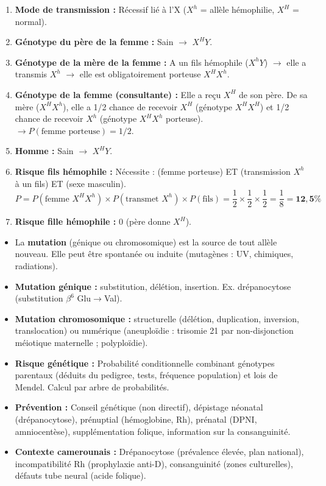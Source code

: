 \documentclass[11pt]{article}
\begin{document}
\begin{corrige}[Exercice n]
\begin{enumerate}
    \item \textbf{Mode de transmission :} Récessif lié à l'X ($X^h$ = allèle hémophilie, $X^H$ = normal).
    \item \textbf{Génotype du père de la femme :} Sain $\to$ $X^H Y$.
    \item \textbf{Génotype de la mère de la femme :} A un fils hémophile ($X^h Y$) $\to$ elle a transmis $X^h$ $\to$ elle est obligatoirement porteuse $X^H X^h$.
    \item \textbf{Génotype de la femme (consultante) :} Elle a reçu $X^H$ de son père. De sa mère ($X^H X^h$), elle a 1/2 chance de recevoir $X^H$ (génotype $X^H X^H$) et 1/2 chance de recevoir $X^h$ (génotype $X^H X^h$ porteuse).
    $\to P(\text{femme porteuse}) = 1/2$.
    \item \textbf{Homme :} Sain $\to$ $X^H Y$.
    \item \textbf{Risque fils hémophile :} Nécessite : (femme porteuse) ET (transmission $X^h$ à un fils) ET (sexe masculin).
    \[
    P = P(\text{femme } X^H X^h) \times P(\text{transmet } X^h) \times P(\text{fils}) = \frac{1}{2} \times \frac{1}{2} \times \frac{1}{2} = \frac{1}{8} = \mathbf{12,5 \%}
    \]
    \item \textbf{Risque fille hémophile :} 0 (père donne $X^H$).
\end{enumerate}
\end{corrige}

\begin{aretenir}
\begin{itemize}
    \item La \textbf{mutation} (génique ou chromosomique) est la source de tout allèle nouveau. Elle peut être spontanée ou induite (mutagènes : UV, chimiques, radiations).
    \item \textbf{Mutation génique :} substitution, délétion, insertion. Ex. drépanocytose (substitution $\beta^6$ Glu$\to$Val).
    \item \textbf{Mutation chromosomique :} structurelle (délétion, duplication, inversion, translocation) ou numérique (aneuploïdie : trisomie 21 par non-disjonction méiotique maternelle ; polyploïdie).
    \item \textbf{Risque génétique :} Probabilité conditionnelle combinant génotypes parentaux (déduits du pedigree, tests, fréquence population) et lois de Mendel. Calcul par arbre de probabilités.
    \item \textbf{Prévention :} Conseil génétique (non directif), dépistage néonatal (drépanocytose), prénuptial (hémoglobine, Rh), prénatal (DPNI, amniocentèse), supplémentation folique, information sur la consanguinité.
    \item \textbf{Contexte camerounais :} Drépanocytose (prévalence élevée, plan national), incompatibilité Rh (prophylaxie anti-D), consanguinité (zones culturelles), défauts tube neural (acide folique).
\end{itemize}
\end{aretenir}
\end{document}

